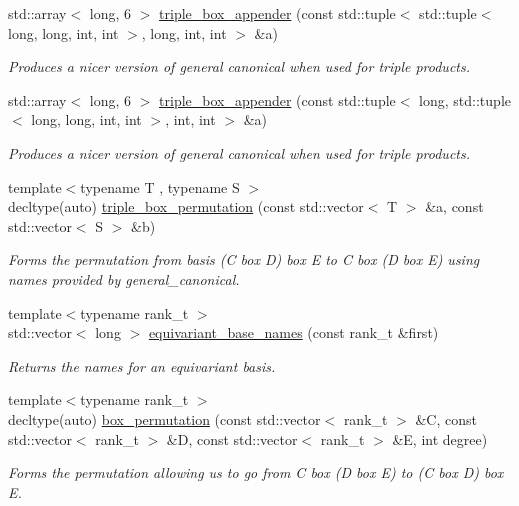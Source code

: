 \begin{DoxyCompactItemize}
std\+::array$<$ long, 6 $>$ \hyperlink{namespaceMackey_1_1internal_a3ad5c7d43d4f8e63a3b6a8ec55f85dfa}{triple\+\_\+box\+\_\+appender} (const std\+::tuple$<$ std\+::tuple$<$ long, long, int, int $>$, long, int, int $>$ \&a)
\begin{DoxyCompactList}\small\item\em Produces a nicer version of general canonical when used for triple products. \end{DoxyCompactList}\item 
std\+::array$<$ long, 6 $>$ \hyperlink{namespaceMackey_1_1internal_ac9c5122d0b7488b13f15bb6a7e03a9f8}{triple\+\_\+box\+\_\+appender} (const std\+::tuple$<$ long, std\+::tuple$<$ long, long, int, int $>$, int, int $>$ \&a)
\begin{DoxyCompactList}\small\item\em Produces a nicer version of general canonical when used for triple products. \end{DoxyCompactList}\item 
{\footnotesize template$<$typename T , typename S $>$ }\\decltype(auto) \hyperlink{namespaceMackey_1_1internal_a2647c2357084142a1647364848db3205}{triple\+\_\+box\+\_\+permutation} (const std\+::vector$<$ T $>$ \&a, const std\+::vector$<$ S $>$ \&b)
\begin{DoxyCompactList}\small\item\em Forms the permutation from basis (C box D) box E to C box (D box E) using names provided by general\+\_\+canonical. \end{DoxyCompactList}\item 
{\footnotesize template$<$typename rank\+\_\+t $>$ }\\std\+::vector$<$ long $>$ \hyperlink{namespaceMackey_1_1internal_ad3470eee0665ddd466ea1fc98adffd7c}{equivariant\+\_\+base\+\_\+names} (const rank\+\_\+t \&first)
\begin{DoxyCompactList}\small\item\em Returns the names for an equivariant basis. \end{DoxyCompactList}\item 
{\footnotesize template$<$typename rank\+\_\+t $>$ }\\decltype(auto) \hyperlink{namespaceMackey_1_1internal_a4b352efa632d7cfab147b728a0d39491}{box\+\_\+permutation} (const std\+::vector$<$ rank\+\_\+t $>$ \&C, const std\+::vector$<$ rank\+\_\+t $>$ \&D, const std\+::vector$<$ rank\+\_\+t $>$ \&E, int degree)
\begin{DoxyCompactList}\small\item\em Forms the permutation allowing us to go from C box (D box E) to (C box D) box E. \end{DoxyCompactList}\end{DoxyCompactItemize}


